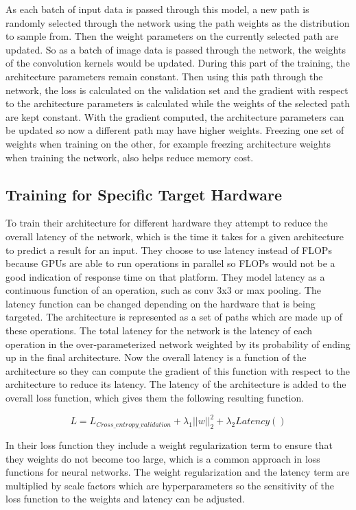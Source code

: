 \documentclass{ieee}
\begin{document}
As each batch of input data is passed through this model, a new path is randomly selected through the network using the path weights as the distribution to sample from. Then the weight parameters on the currently selected path are updated. So as a batch of image data is passed through the network, the weights of the convolution kernels would be updated. During this part of the training, the architecture parameters remain constant. Then using this path through the network, the loss is calculated on the validation set and the gradient with respect to the architecture parameters is calculated while the weights of the selected path are kept constant. With the gradient computed, the architecture parameters can be updated so now a different path may have higher weights. Freezing one set of weights when training on the other, for example freezing architecture weights when training the network, also helps reduce memory cost.

\subsection{Training for Specific Target Hardware}

To train their architecture for different hardware they attempt to reduce the overall latency of the network, which is the time it takes for a given architecture to predict a result for an input. They choose to use latency instead of FLOPs because GPUs are able to run operations in parallel so FLOPs would not be a good indication of response time on that platform. They model latency as a continuous function of an operation, such as conv 3x3 or max pooling. The latency function can be changed depending on the hardware that is being targeted. The architecture is represented as a set of paths which are made up of these operations. The total latency for the network is the latency of each operation in the over-parameterized network weighted by its probability of ending up in the final architecture. Now the overall latency is a function of the architecture so they can compute the gradient of this function with respect to the architecture to reduce its latency. The latency of the architecture is added to the overall loss function, which gives them the following resulting function. 

\begin{equation}
    L = L_{Cross\_entropy\_validation} + \lambda_1 ||w||_2^2 + \lambda_2Latency()
\end{equation}

In their loss function they include a weight regularization term to ensure that they weights do not become too large, which is a common approach in loss functions for neural networks. The weight regularization and the latency term are multiplied by scale factors which are hyperparameters so the sensitivity of the loss function to the weights and latency can be adjusted.
\end{document}
